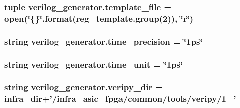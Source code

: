 \hypertarget{namespaceverilog__generator_a3333ead908a28b77546390c93f38929f}{
\subsubsection[{template\-\_\-file}]{\setlength{\rightskip}{0pt plus 5cm}tuple verilog\-\_\-generator.\-template\-\_\-file = open(\char`\"{}\{\}\char`\"{}.{\bf format}(reg\-\_\-template.\-group(2)), \char`\"{}r\char`\"{})}}\label{namespaceverilog__generator_a3333ead908a28b77546390c93f38929f}
\hypertarget{namespaceverilog__generator_abf2ac36940267286c7a5391623e03573}{
\subsubsection[{time\-\_\-precision}]{\setlength{\rightskip}{0pt plus 5cm}string verilog\-\_\-generator.\-time\-\_\-precision = \char`\"{}1ps\char`\"{}}}\label{namespaceverilog__generator_abf2ac36940267286c7a5391623e03573}
\hypertarget{namespaceverilog__generator_adf7c6221b08ab4fb64b0982313fd0ff7}{
\subsubsection[{time\-\_\-unit}]{\setlength{\rightskip}{0pt plus 5cm}string verilog\-\_\-generator.\-time\-\_\-unit = \char`\"{}1ps\char`\"{}}}\label{namespaceverilog__generator_adf7c6221b08ab4fb64b0982313fd0ff7}
\hypertarget{namespaceverilog__generator_aef66d07ac5937a888f2a6087df98f168}{
\subsubsection[{veripy\-\_\-dir}]{\setlength{\rightskip}{0pt plus 5cm}string verilog\-\_\-generator.\-veripy\-\_\-dir = {\bf infra\-\_\-dir}+'/infra\-\_\-asic\-\_\-fpga/common/tools/veripy/1\-\_'}}\label{namespaceverilog__generator_aef66d07ac5937a888f2a6087df98f168}
